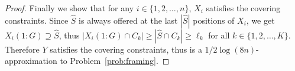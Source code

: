 \documentclass[10pt,a4paper]{amsart}
\begin{document}
\begin{proof}
Finally we show that for any $i\in\{1,2,\dots,n\}$, $X_i$ satisfies the covering constraints. Since $\hat{S}$ is always offered at the last $|\hat{S}|$ positions of $X_i$, we get $X_i(1:G)\supseteq \hat{S}$, thus $|X_i(1:G)\cap C_k|\geq |\hat{S}\cap C_k|\geq \ell_k$ for all $k\in\{1,2,\dots,K\}$. Therefore $Y$ satisfies the covering constraints, thus is a $1/2\log(8n)$-approximation to Problem~\eqref{prob:framing}.
\end{proof}
\end{document}
